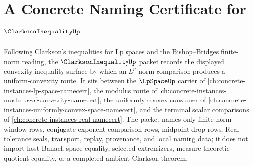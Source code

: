 \chapter{A Concrete Naming Certificate for $\ClarksonInequalityUp$}
\label{ch:concrete-instances-clarkson-inequality-namecert}

Following Clarkson's inequalities for Lp spaces and the Bishop--Bridges finite-norm reading, the $\ClarksonInequalityUp$ packet records the displayed convexity inequality surface by which an $L^p$ norm comparison produces a uniform-convexity route. It sits between the $\LpSpaceUp$ carrier of \autoref{ch:concrete-instances-lp-space-namecert}, the modulus route of \autoref{ch:concrete-instances-modulus-of-convexity-namecert}, the uniformly convex consumer of \autoref{ch:concrete-instances-uniformly-convex-space-namecert}, and the terminal scalar comparisons of \autoref{ch:concrete-instances-real-namecert}. The packet names only finite norm-window rows, conjugate-exponent comparison rows, midpoint-drop rows, Real tolerance seals, transport, replay, provenance, and local naming data; it does not import host Banach-space equality, selected extremizers, measure-theoretic quotient equality, or a completed ambient Clarkson theorem.

